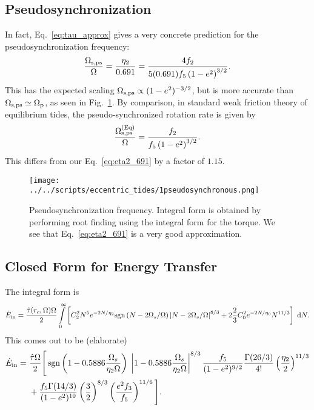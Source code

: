 \documentclass[
        fleqn,
        usenatbib,
        referee,
    ]{mnras}
\newcommand*{\p}[1]{\left(#1\right)}
\DeclareMathOperator*{\sgn}{sgn}
\begin{document}
\subsection{Pseudosynchronization}

In fact, Eq.~\eqref{eq:tau_approx} gives a very concrete prediction for the
pseudosynchronization frequency:
\begin{equation}
    \frac{\Omega_{\rm s, ps}}{\Omega} =
        \frac{\eta_2}{0.691} = \frac{4f_2}{5(0.691)f_5\p{1 -
        e^2}^{3/2}}.\label{eq:eta2_691}
\end{equation}
This has the expected scaling $\Omega_{\rm s, ps} \propto (1 - e^2)^{-3/2}$,
but is more accurate than $\Omega_{\rm s, ps} \simeq \Omega_{\rm p}$, as seen
in Fig.~\ref{fig:pseudosync}. By comparison, in standard weak friction theory of
equilibrium tides, the pseudo-synchronized rotation rate is given by
\citep{alexander73, hut81}
\begin{equation}
    \frac{\Omega_{\rm s, ps}^{\rm (Eq)}}{\Omega} = \frac{f_2}{f_5\p{1 -
        e^2}^{3/2}}.
\end{equation}
This differs from our Eq.~\eqref{eq:eta2_691} by a factor of $1.15$.
\begin{figure}
    \centering
    \texttt{[image: ../../scripts/eccentric\_tides/1pseudosynchronous.png]}
    \caption{Pseudosynchronization frequency. Integral form is obtained by
    performing root finding using the integral form for the torque. We see that
    Eq.~\eqref{eq:eta2_691} is a very good approximation.}\label{fig:pseudosync}
\end{figure}

\subsection{Closed Form for Energy Transfer}

The integral form is
\begin{equation}
    \dot{E}_{\rm in} =
        \frac{\hat{\tau}(r_c, \Omega) \Omega}{2} \int\limits_0^\infty \left[
            C_2^2 N^5 e^{-2N/\eta_2} \mathrm{sgn}\left(N - 2\Omega_s /
                \Omega\right) \left|N - 2 \Omega_s / \Omega\right|^{8/3}
            + 2 \frac{2}{3} C_0^2 e^{-2N / \eta_0} N^{11/3}
        \right]\;\mathrm{d}N.\label{eq:heating_int}
\end{equation}
This comes out to be (elaborate)
\begin{align}
    \dot{E}_{\rm in} ={}& \frac{\hat{\tau}\Omega}{2}\Bigg[
    \sgn\left(1 - 0.5886\frac{\Omega_s}{\eta_2 \Omega}\right)\;\left|1 -
        0.5886\frac{\Omega_s}{\eta_2 \Omega}\right|^{8/3}
            \frac{f_5}{(1 - e^2)^{9/2}}
            \frac{\Gamma(26/3)}{4!} \left(\frac{\eta_2}{2}\right)^{11/3}
            \nonumber\\
        &+
    \frac{f_5 \Gamma(14 / 3)}{(1 - e^2)^{10}} \left(\frac{3}{2}\right)^{8/3}
            \left(\frac{e^2 f_3}{f_5}\right)^{11/6}\Bigg].
            \label{eq:total_heating}
\end{align}
\end{document}
